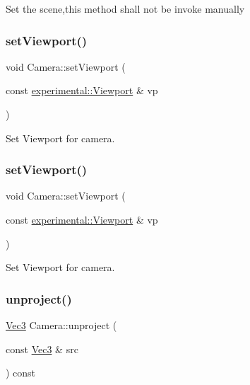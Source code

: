 Set the scene,this method shall not be invoke manually \mbox{\label{classCamera_a3070783685089524b0fc5b38d9623b9e}} 
\subsubsection{\texorpdfstring{set\+Viewport()}{setViewport()}\hspace{0.1cm}{\footnotesize\ttfamily [1/2]}}
{\footnotesize\ttfamily void Camera\+::set\+Viewport (\begin{DoxyParamCaption}\item[{const \hyperlink{structexperimental_1_1Viewport}{experimental\+::\+Viewport} \&}]{vp }\end{DoxyParamCaption})}

Set Viewport for camera. \mbox{\label{classCamera_a3070783685089524b0fc5b38d9623b9e}} 
\subsubsection{\texorpdfstring{set\+Viewport()}{setViewport()}\hspace{0.1cm}{\footnotesize\ttfamily [2/2]}}
{\footnotesize\ttfamily void Camera\+::set\+Viewport (\begin{DoxyParamCaption}\item[{const \hyperlink{structexperimental_1_1Viewport}{experimental\+::\+Viewport} \&}]{vp }\end{DoxyParamCaption})}

Set Viewport for camera. \mbox{\label{classCamera_a06eccde5c9fc644d94e69e505a78d048}} 
\subsubsection{\texorpdfstring{unproject()}{unproject()}\hspace{0.1cm}{\footnotesize\ttfamily [1/4]}}
{\footnotesize\ttfamily \hyperlink{classVec3}{Vec3} Camera\+::unproject (\begin{DoxyParamCaption}\item[{const \hyperlink{classVec3}{Vec3} \&}]{src }\end{DoxyParamCaption}) const}

